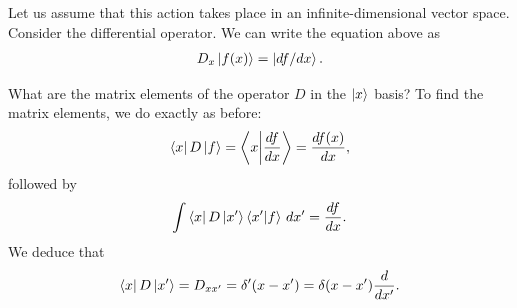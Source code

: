 \documentclass{book}
\theoremstyle{definition}
\newcommand{\f}[2]{\frac{#1}{#2}}
\begin{document}
Let us assume that this action takes place in an infinite-dimensional vector space. Consider the differential operator. We can write the equation above as
\begin{align}
D_x\ket{f(x)} = \ket{df/dx}.
\end{align}

What are the matrix elements of the operator $D$ in the $\ket{x}$ basis? To find the matrix elements, we do exactly as before:
\begin{align}
\bra{x}D\ket{f} = \braket{x}{\f{df}{dx}} = \f{df(x)}{dx},
\end{align}
followed by
\begin{align}
\int \bra{x}D\ket{x'}\bra{x'}\ket{f}\,dx' = \f{df}{dx}.
\end{align}
We deduce that 
\begin{align}
\bra{x}D\ket{x'} = D_{xx'} = \delta'(x-x') = \delta(x-x')\f{d}{dx'}.
\end{align}
\end{document}
